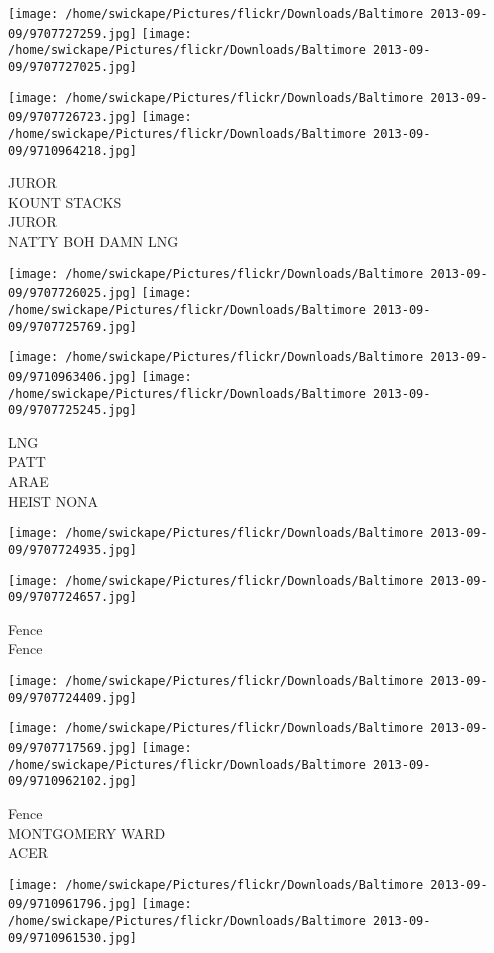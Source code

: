 \documentclass[10pt,letterpaper]{article}
\begin{document}
\texttt{[image: /home/swickape/Pictures/flickr/Downloads/Baltimore 2013-09-09/9707727259.jpg]}
\texttt{[image: /home/swickape/Pictures/flickr/Downloads/Baltimore 2013-09-09/9707727025.jpg]}

\texttt{[image: /home/swickape/Pictures/flickr/Downloads/Baltimore 2013-09-09/9707726723.jpg]}
\texttt{[image: /home/swickape/Pictures/flickr/Downloads/Baltimore 2013-09-09/9710964218.jpg]}

JUROR\\
KOUNT STACKS\\
JUROR\\
NATTY BOH DAMN LNG
\pagebreak

\texttt{[image: /home/swickape/Pictures/flickr/Downloads/Baltimore 2013-09-09/9707726025.jpg]}
\texttt{[image: /home/swickape/Pictures/flickr/Downloads/Baltimore 2013-09-09/9707725769.jpg]}

\texttt{[image: /home/swickape/Pictures/flickr/Downloads/Baltimore 2013-09-09/9710963406.jpg]}
\texttt{[image: /home/swickape/Pictures/flickr/Downloads/Baltimore 2013-09-09/9707725245.jpg]}

LNG\\
PATT\\
ARAE\\
HEIST NONA
\pagebreak

\texttt{[image: /home/swickape/Pictures/flickr/Downloads/Baltimore 2013-09-09/9707724935.jpg]}

\vspace{0.25in}
\texttt{[image: /home/swickape/Pictures/flickr/Downloads/Baltimore 2013-09-09/9707724657.jpg]}

Fence\\
Fence
\pagebreak

\texttt{[image: /home/swickape/Pictures/flickr/Downloads/Baltimore 2013-09-09/9707724409.jpg]}

\vspace{0.25in}
\texttt{[image: /home/swickape/Pictures/flickr/Downloads/Baltimore 2013-09-09/9707717569.jpg]}
\texttt{[image: /home/swickape/Pictures/flickr/Downloads/Baltimore 2013-09-09/9710962102.jpg]}

Fence\\
MONTGOMERY WARD\\
ACER
\pagebreak

\texttt{[image: /home/swickape/Pictures/flickr/Downloads/Baltimore 2013-09-09/9710961796.jpg]}
\texttt{[image: /home/swickape/Pictures/flickr/Downloads/Baltimore 2013-09-09/9710961530.jpg]}
\end{document}
